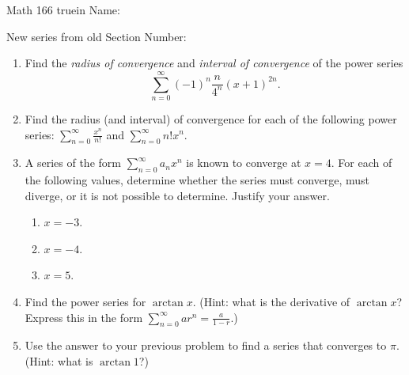 \documentclass[12pt]{article}
\begin{document}
\pagestyle{empty} %

\noindent
{Math 166  truein  Name:\ \hrulefill}

\noindent
{New series from old}
\noindent \hspace{2.5in} Section Number: \hrulefill
\bigskip


\begin{enumerate}
\item Find the \emph{radius of convergence} and \emph{interval of convergence} of the power series  
\[\displaystyle\sum_{n=0}^{\infty} (-1)^n \displaystyle\frac{n}{4^n}(x+1)^{2n}.\]


\vfill


\item Find the {radius (and interval) of convergence} for each of the following power series:  $\displaystyle\sum_{n=0}^{\infty} \displaystyle\frac{x^{n}}{n!}$ and  $\displaystyle\sum_{n=0}^{\infty} n!x^{n}$.

\vfill

\pagebreak
\item A series of the form $\sum_{n = 0}^\infty a_n x^n$ is known to converge at $x = 4$.  For each of the following values, determine whether the series must converge, must diverge, or it is not possible to determine.  Justify your answer.
\begin{enumerate}
\item $x = -3$.
\vspace{1 in}
\item $x = -4$.
\vspace{1 in}
\item $x = 5$.
\vspace{1 in}
\end{enumerate}



\item Find the power series for $\arctan x$.  (Hint: what is the derivative of $\arctan x$?  Express this in the form $\displaystyle \sum_{n = 0}^\infty ar^n = \frac{a}{1 - r}$.)
\vfill
\vfill
\vfill


\item Use the answer to your previous problem to find a series that converges to $\pi$.  (Hint: what is $\arctan 1$?)
\vfill


\end{enumerate}
\end{document}
